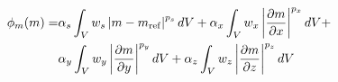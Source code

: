 \begin{equation}
\begin{split}
\phi_m(m) = & \alpha_s \int_V w_s \left| m - m_{\rm ref}\right|^{p_s} dV +
\alpha_x \int_V w_x \left| \frac{\partial m}{\partial x} \right|^{p_{x}} dV + \\
&\alpha_y \int_V w_y \left| \frac{\partial m}{\partial y} \right|^{p_{y}} dV +
\alpha_z \int_V w_z \left| \frac{\partial m}{\partial z} \right|^{p_{z}} dV
\end{split}
\label{eq:regularization}
\end{equation}

